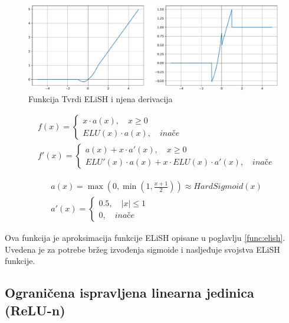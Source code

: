 \documentclass[times, utf8, numeric, diplomski]{fer}
\def\otherwise{\textit{inače}}
\begin{document}
\begin{figure}[H]
\includegraphics[width=\textwidth]{Hard_ELiSH.pdf}
\centering
\caption{Funkcija Tvrdi ELiSH i njena derivacija}
\label{fig:hard_elish}
\end{figure}

\begin{equation}
\begin{split}
&f(x) =
	\begin{cases}
		x \cdot a(x), \quad x \geq 0 \\
		ELU(x) \cdot a(x), \quad \otherwise
	\end{cases} \\
&f'(x) = \begin{cases}
	a(x) + x \cdot a'(x), \quad x \geq 0 \\
	ELU'(x) \cdot a(x) + x \cdot ELU(x) \cdot a'(x), \quad \otherwise
\end{cases}
\end{split}
\end{equation}

\begin{equation}
\begin{split}
&a(x) = \max(0, \min(1, \frac{x+1}{2})) \approx HardSigmoid(x) \\
&a'(x) =
\begin{cases}
	0.5, \quad |x| \leq 1 \\
	0, \quad \otherwise
\end{cases}	
\end{split}
\end{equation}

Ova funkcija je aproksimacija funkcije ELiSH opisane u poglavlju \ref{func:elish}. Uvedena je za potrebe bržeg izvođenja sigmoide i nasljeđuje svojstva ELiSH funkcije. \citep{elish}

\subsection{Ograničena ispravljena linearna jedinica (ReLU-n)}
\label{func:relun}
\end{document}
